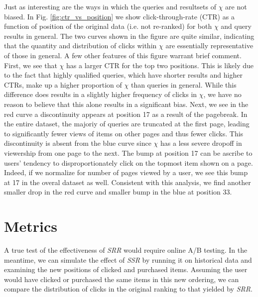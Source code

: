 \documentclass{article}
\begin{document}
Just as interesting are the ways in which the queries and resultsets of $\chi$
are not biased. In Fig. \ref{fig:ctr_vs_position} we show click-through-rate
(CTR) as a function of position of the original data (i.e. not re-ranked) for
both $\chi$ and query results in general. The two curves shown in the figure are
quite similar, indicating that the quantity and distribution of clicks within
$\chi$ are essentially representative of those in general. A few other features
of this figure warrant brief comment. First, we see that $\chi$ has a larger CTR
for the top two positions. This is likely due to the fact that highly qualified
queries, which have shorter results and higher CTRs,  make up a higher
proportion of $\chi$ than queries in general. While this difference does results
in a slightly higher frequency of clicks in $\chi$, we have no reason to believe
that this alone results in a significant bias. Next, we see in the red curve a
discontinuity appears at position 17 as a result of the pagebreak. In the entire
dataset, the majoriy of queries are truncated at the first page, leading to
significantly fewer views of items on other pages and thus fewer clicks. This
discontinuity is absent from the blue curve since $\chi$ has a less severe
dropoff in viewership from one page to the next.  The bump at position 17 can be
ascribe to users' tendency to disproportionately click on the topmost item shown
on a page. Indeed, if we normalize for number of pages viewed by a user, we see
this bump at 17 in the overal dataset as well. Consistent with this analysis, we
find another smaller drop in the red curve and smaller bump in the blue at
position 33.

\section{Metrics}

A true test of the effectiveness of {\em SRR} would require online A/B
testing. In the meantime, we can simulate the effect of {\em SSR} by running it
on historical data and examining the new positions of clicked and purchased items.
Assuming the user would have clicked or purchased the same items in this new ordering, 
we can compare the distribution of clicks in the original ranking to that yielded 
by {\em SRR}.
\end{document}
